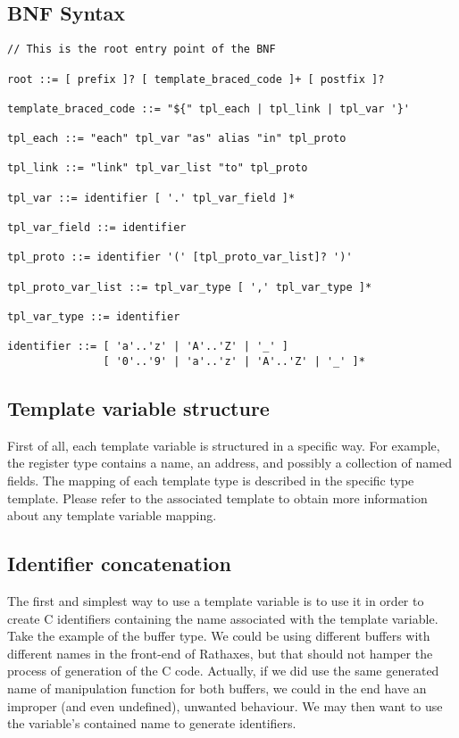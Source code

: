 \documentclass[american]{rtxreport}
\begin{document}
\subsection{BNF Syntax}

\lstset{}
\begin{lstlisting}
// This is the root entry point of the BNF

root ::= [ prefix ]? [ template_braced_code ]+ [ postfix ]?

template_braced_code ::= "${" tpl_each | tpl_link | tpl_var '}'

tpl_each ::= "each" tpl_var "as" alias "in" tpl_proto

tpl_link ::= "link" tpl_var_list "to" tpl_proto

tpl_var ::= identifier [ '.' tpl_var_field ]*

tpl_var_field ::= identifier

tpl_proto ::= identifier '(' [tpl_proto_var_list]? ')'

tpl_proto_var_list ::= tpl_var_type [ ',' tpl_var_type ]*

tpl_var_type ::= identifier

identifier ::= [ 'a'..'z' | 'A'..'Z' | '_' ]
               [ '0'..'9' | 'a'..'z' | 'A'..'Z' | '_' ]*

\end{lstlisting}

\subsection{Template variable structure}

First of all, each template variable is structured in a specific way. For
example, the register type contains a name, an address, and possibly a
collection of named fields. The mapping of each template type is described in
the specific type template. Please refer to the associated template to obtain
more information about any template variable mapping.

\subsection{Identifier concatenation}

The first and simplest way to use a template variable is to use it in order to
create C identifiers containing the name associated with the template variable.
Take the example of the buffer type. We could be using different buffers with
different names in the front-end of Rathaxes, but that should not hamper the
process of generation of the C code. Actually, if we did use the same generated
name of manipulation function for both buffers, we could in the end have an
improper (and even undefined), unwanted behaviour. We may then want to use the
variable's contained name to generate identifiers.
\end{document}
